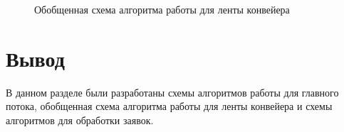 \begin{figure}
	\caption{Обобщенная схема алгоритма работы для ленты конвейера}
	\label{ZBufferWithThreads}
\end{figure}

\newpage
\section{Вывод}
В данном разделе были разработаны схемы алгоритмов работы для главного потока, обобщенная схема алгоритма работы для ленты конвейера и схемы алгоритмов для обработки заявок.
